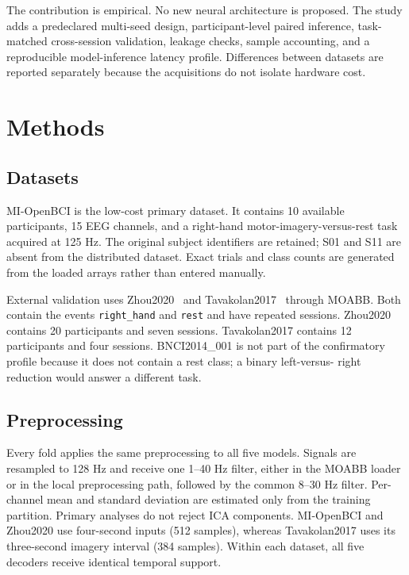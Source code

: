 \documentclass[conference]{IEEEtran}
\begin{document}
The contribution is empirical. No new neural architecture is proposed. The study adds a
predeclared multi-seed design, participant-level paired inference, task-matched cross-session
validation, leakage checks, sample accounting, and a reproducible model-inference latency profile.
Differences between datasets are reported separately because the acquisitions do not isolate
hardware cost.

\section{Methods}

\subsection{Datasets}

MI-OpenBCI is the low-cost primary dataset. It contains 10 available participants, 15 EEG channels,
and a right-hand motor-imagery-versus-rest task acquired at 125 Hz. The original subject identifiers
are retained; S01 and S11 are absent from the distributed dataset. Exact trials and class counts are
generated from the loaded arrays rather than entered manually.

External validation uses Zhou2020~\cite{zhou} and Tavakolan2017~\cite{tavakolan} through MOABB. Both contain the events
\texttt{right\_hand} and \texttt{rest} and have repeated sessions. Zhou2020 contains 20 participants
and seven sessions. Tavakolan2017 contains 12 participants and four sessions. BNCI2014\_001 is not
part of the confirmatory profile because it does not contain a rest class; a binary left-versus-
right reduction would answer a different task.

\subsection{Preprocessing}

Every fold applies the same preprocessing to all five models. Signals are resampled to 128 Hz and
receive one 1--40 Hz filter, either in the MOABB loader or in the local preprocessing path, followed
by the common 8--30 Hz filter. Per-channel mean and standard deviation are estimated only from the
training partition. Primary analyses do not reject ICA components. MI-OpenBCI and Zhou2020 use
four-second inputs (512 samples), whereas Tavakolan2017 uses its three-second imagery interval
(384 samples). Within each dataset, all five decoders receive identical temporal support.
\end{document}
